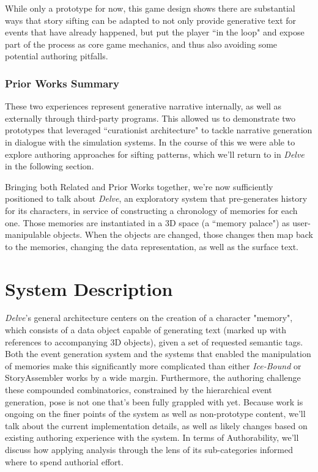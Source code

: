 While only a prototype for now, this game design shows there are substantial ways that story sifting can be adapted to not only provide generative text for events that have already happened, but put the player ``in the loop" and expose part of the process as core game mechanics, and thus also avoiding some potential authoring pitfalls.

\subsubsection{Prior Works Summary}\label{subsubsec:delve-prior-works-summary}

These two experiences represent generative narrative internally, as well as externally through third-party programs. This allowed us to demonstrate two prototypes that leveraged ``curationist architecture" to tackle narrative generation in dialogue with the simulation systems. In the course of this we were able to explore authoring approaches for sifting patterns, which we'll return to in \textit{Delve} in the following section.

Bringing both Related and Prior Works together, we're now sufficiently positioned to talk about \textit{Delve}, an exploratory system that pre-generates history for its characters, in service of constructing a chronology of memories for each one. Those memories are instantiated in a 3D space (a ``memory palace") as user-manipulable objects. When the objects are changed, those changes then map back to the memories, changing the data representation, as well as the surface text.

\section{System Description}\label{sec:delve-system-description}

\textit{Delve}'s general architecture centers on the creation of a character "memory", which consists of a data object capable of generating text (marked up with references to accompanying 3D objects), given a set of requested semantic tags. Both the event generation system and the systems that enabled the manipulation of memories make this significantly more complicated than either\textit{ Ice-Bound} or StoryAssembler works by a wide margin. Furthermore, the authoring challenge these compounded combinatorics, constrained by the hierarchical event generation, pose is not one that's been fully grappled with yet. Because work is ongoing on the finer points of the system as well as non-prototype content, we'll talk about the current implementation details, as well as likely changes based on existing authoring experience with the system. In terms of Authorability, we'll discuss how applying analysis through the lens of its sub-categories informed where to spend authorial effort.


